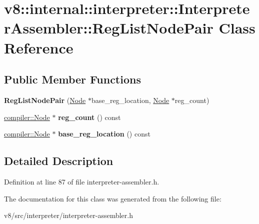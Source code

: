 \hypertarget{classv8_1_1internal_1_1interpreter_1_1InterpreterAssembler_1_1RegListNodePair}{}\section{v8\+:\+:internal\+:\+:interpreter\+:\+:Interpreter\+Assembler\+:\+:Reg\+List\+Node\+Pair Class Reference}
\label{classv8_1_1internal_1_1interpreter_1_1InterpreterAssembler_1_1RegListNodePair}
\subsection*{Public Member Functions}
\begin{DoxyCompactItemize}
\item 
\mbox{\label{classv8_1_1internal_1_1interpreter_1_1InterpreterAssembler_1_1RegListNodePair_aa500d7204ddf07c8fc2003d1b83fbab3}} 
{\bfseries Reg\+List\+Node\+Pair} (\mbox{\hyperlink{classv8_1_1internal_1_1compiler_1_1Node}{Node}} $\ast$base\+\_\+reg\+\_\+location, \mbox{\hyperlink{classv8_1_1internal_1_1compiler_1_1Node}{Node}} $\ast$reg\+\_\+count)
\item 
\mbox{\label{classv8_1_1internal_1_1interpreter_1_1InterpreterAssembler_1_1RegListNodePair_a63435e38051f97f2cd06e54c70c6cd9c}} 
\mbox{\hyperlink{classv8_1_1internal_1_1compiler_1_1Node}{compiler\+::\+Node}} $\ast$ {\bfseries reg\+\_\+count} () const
\item 
\mbox{\label{classv8_1_1internal_1_1interpreter_1_1InterpreterAssembler_1_1RegListNodePair_af0930d7278cf270e393d20f815d62013}} 
\mbox{\hyperlink{classv8_1_1internal_1_1compiler_1_1Node}{compiler\+::\+Node}} $\ast$ {\bfseries base\+\_\+reg\+\_\+location} () const
\end{DoxyCompactItemize}


\subsection{Detailed Description}


Definition at line 87 of file interpreter-\/assembler.\+h.



The documentation for this class was generated from the following file\+:\begin{DoxyCompactItemize}
\item 
v8/src/interpreter/interpreter-\/assembler.\+h\end{DoxyCompactItemize}
